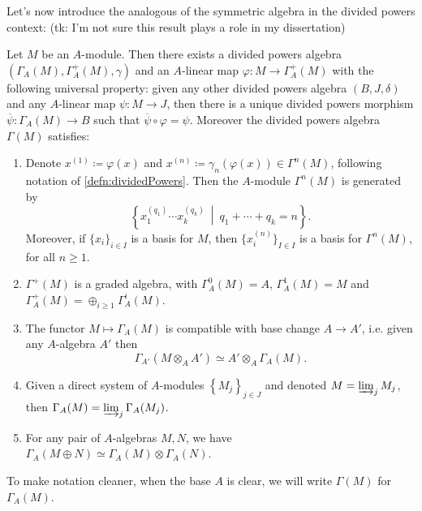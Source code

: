 \documentclass[../Main]{subfiles}
\begin{document}
\noindent
Let's now introduce the analogous of the symmetric algebra 
in the divided powers context:
(tk: I'm not sure this result plays a role in my dissertation)


\begin{thm}
	Let $M$ be an $A$-module.
	Then there exists a divided powers algebra 
	$\left(\Gamma_A(M), \Gamma_A^+(M), \gamma\right)$ and an $A$-linear
	map $\varphi\colon M \to \Gamma_A^+(M)$ with the following
	universal property:
	given any other divided powers algebra
	$\left(B, J, \delta\right)$ and any $A$-linear
	map $\psi\colon M \to J$,
	then there is a unique divided powers morphism
	$\overline{\psi}\colon \Gamma_A(M) \to B$
	such that $\overline{\psi} \circ \varphi = \psi$.
	Moreover the divided powers algebra $\Gamma(M)$ satisfies:
\begin{enumerate}
	\item Denote $x^{(1)} \coloneqq \varphi(x)$ and $x^{(n)} \coloneqq \gamma_n(\varphi(x)) \in
		\Gamma^n(M)$, following notation of \cref{defn:dividedPowers}.
		Then the $A$-module $\Gamma^n(M)$ is generated by
		\begin{equation*}
		\left\{ x_1^{(q_1)} \cdots x_k^{(q_k)} \ \middle|\ 
		q_1 + \cdots + q_k = n \right\}
		.\end{equation*}
		Moreover, if $\{ x_i \}_{i \in I}$ is a basis
		for $M$, then $\{ x^{(n)}_i \}_{I \in I}$
		is a basis for $\Gamma^n(M)$,
		for all $n \geq 1$.

	\item $\Gamma^+(M)$ is a graded algebra, with
		$\Gamma_A^0(M) = A$, $\Gamma_A^1(M) = M$
		and $\Gamma_A^+(M) = \oplus_{i \geq 1} \Gamma_A^i(M)$.

	\item The functor $M \mapsto \Gamma_A(M)$ is compatible with
		base change $A \to A'$, i.e. given any $A$-algebra $A'$
		then
		\begin{equation*}
			\Gamma_{A'}(M \otimes_A A') \simeq A' \otimes_A \Gamma_A(M)
		.\end{equation*}

	\item Given a direct system of $A$-modules $\left\{ M_j \right\}_{j \in J}$ 
		and denoted $M = \varinjlim_j M_j$, then $\Gamma_A(M) = \varinjlim_{j} \Gamma_A(M_j)$.

	\item For any pair of $A$-algebras $M, N$, we have $\Gamma_A(M \oplus N)
		\simeq \Gamma_A(M) \otimes \Gamma_A(N)$.
\end{enumerate}
	To make notation cleaner, when the base $A$ is clear, we
	will write $\Gamma(M)$ for $\Gamma_A(M)$.
\end{thm}
\end{document}
